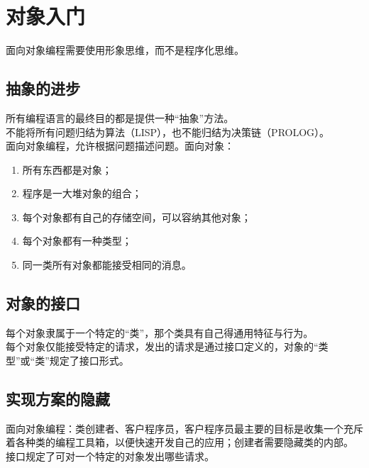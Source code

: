\chapter{对象入门}
面向对象编程需要使用形象思维，而不是程序化思维。
\section{抽象的进步}
所有编程语言的最终目的都是提供一种“抽象”方法。\\
不能将所有问题归结为算法（LISP），也不能归结为决策链（PROLOG）。\\
面向对象编程，允许根据问题描述问题。面向对象：\\
\begin{enumerate}
	\item 所有东西都是对象；
	\item 程序是一大堆对象的组合；
	\item 每个对象都有自己的存储空间，可以容纳其他对象；
	\item 每个对象都有一种类型；
	\item 同一类所有对象都能接受相同的消息。
\end{enumerate}

\section{对象的接口}
每个对象隶属于一个特定的“类”，那个类具有自己得通用特征与行为。\\
每个对象仅能接受特定的请求，发出的请求是通过接口定义的，对象的“类型”或“类”规定了接口形式。\\
\section{实现方案的隐藏}
面向对象编程：类创建者、客户程序员，客户程序员最主要的目标是收集一个充斥着各种类的编程工具箱，以便快速开发自己的应用；创建者需要隐藏类的内部。\\
接口规定了可对一个特定的对象发出哪些请求。
